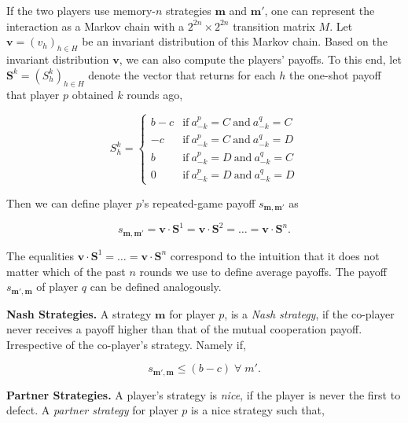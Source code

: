 \documentclass{article}
\theoremstyle{definition}
\begin{document}
If the two players use memory-$n$ strategies $\mathbf{m}$ and $\mathbf{m'}$, one
can represent the interaction as a Markov chain with a $2^{2n}\!\times\!2^{2n}$
transition matrix $M$. Let $\mathbf{v}=(v_h)_{h\in H}$ be an invariant
distribution of this Markov chain. Based on the invariant distribution $\mathbf{v}$, we can also compute the
players' payoffs. To this end, let $\mathbf{S}^k = (S_h^k)_{h\in H}$ denote the
vector that returns for each $h$ the one-shot payoff that player $p$ obtained
$k$ rounds ago,


\begin{equation}
    S_h^k = \left\{
    \begin{array}{cl}
    b-c	&\text{if}~ a_{-k}^p=C~\text{and}~ a_{-k}^q=C\\
    -c	&\text{if}~ a_{-k}^p=C~\text{and}~ a_{-k}^q=D\\
    b	&\text{if}~ a_{-k}^p=D~\text{and}~ a_{-k}^q=C\\
    0	&\text{if}~ a_{-k}^p=D~\text{and}~ a_{-k}^q=D
    \end{array}
    \right.
\end{equation}

Then we can define player $p$'s repeated-game payoff $s_{\mathbf{m},\mathbf{m'}}$ as

\begin{equation} \label{Eq:Payoff}
s_{\mathbf{m},\mathbf{m'}}  = \mathbf{v}\cdot \mathbf{S}^1 = \mathbf{v}\cdot \mathbf{S}^2 = \ldots = \mathbf{v} \cdot \mathbf{S}^n.
\end{equation}

The equalities $\mathbf{v}\cdot \mathbf{S}^1 = \ldots = \mathbf{v} \cdot
\mathbf{S}^n$ correspond to the intuition that it does not matter which of the
past $n$ rounds we use to define average payoffs. The payoff
$s_{\mathbf{m'},\mathbf{m}}$ of player $q$ can be defined analogously.


{\bf Nash Strategies.} A strategy $\mathbf{m}$ for player $p$, is a \textit{Nash
strategy}, if the co-player never receives a payoff higher than that of the
mutual cooperation payoff. Irrespective of the co-player's strategy. Namely if,

\begin{equation}\label{Eq:Nash}
    s_{\mathbf{m'},\mathbf{m}} \leq (b - c) \; \forall \; m'.
\end{equation}

{\bf Partner Strategies.}  A player's strategy is \textit{nice}, if the player
is never the first to defect. A \textit{partner strategy} for player $p$ is a
nice strategy such that,
\end{document}
